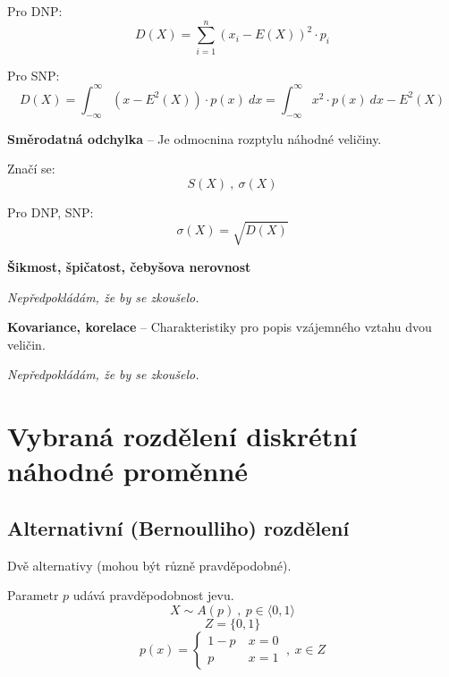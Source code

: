 \begin{compactitem}
\begin{compactitem}
        \item Pro DNP:
        $$ D(X) = \sum_{i=1}^n {\left(x_i - E(X)\right)}^2 \cdot p_i $$

        \item Pro SNP:
        $$ D(X) = \int_{-\infty}^\infty {\left( x - E^2(X) \right)} \cdot p(x) ~ dx = \int_{-\infty}^\infty x^2 \cdot p(x) ~ dx - E^2(X) $$
    \end{compactitem}

    \item \textbf{Směrodatná odchylka} -- Je odmocnina rozptylu náhodné veličiny. \begin{compactitem}
        \item Značí se:
        $$ S(X) ~,~ \sigma(X) $$

        \item Pro DNP, SNP:
        $$ \sigma(X) = \sqrt{D(X)} $$
    \end{compactitem}

    \item \textbf{Šikmost, špičatost, čebyšova nerovnost} \begin{compactitem}
        \item \textit{Nepředpokládám, že by se zkoušelo.}
    \end{compactitem}

    \item \textbf{Kovariance, korelace} -- Charakteristiky pro popis vzájemného vztahu dvou veličin. \begin{compactitem}
        \item \textit{Nepředpokládám, že by se zkoušelo.}
    \end{compactitem}
\end{compactitem}


\section{Vybraná rozdělení diskrétní náhodné proměnné}

\subsection{Alternativní (Bernoulliho) rozdělení}

\begin{compactitem}
    \item Dvě alternativy (mohou být různě pravděpodobné).
    \item Parametr $p$ udává pravděpodobnost jevu.
    $$ X \sim A(p) ~,~ p \in \langle 0, 1 \rangle $$
    $$ Z = \{ 0, 1 \}$$
    $$ p(x) = \left\{
        \begin{array}{ll}
            1-p ~ & x = 0 \\
            p   ~ & x = 1
        \end{array}
        \right. ~,~ x \in Z
    $$
\end{compactitem}

